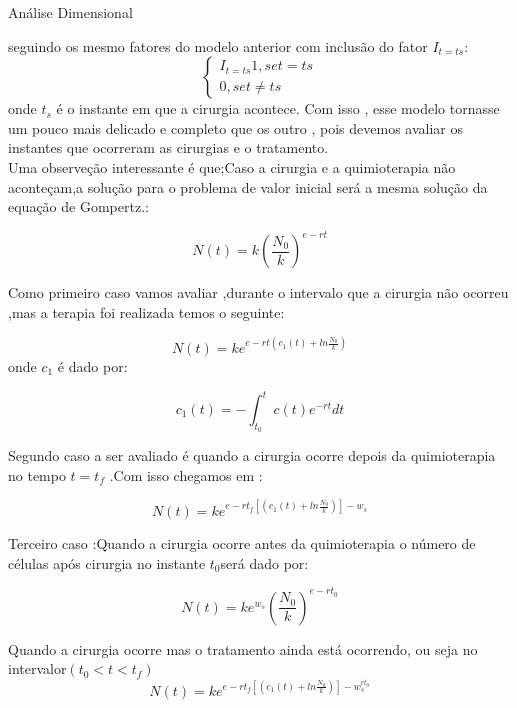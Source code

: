 Análise Dimensional

seguindo os mesmo fatores do modelo anterior com  inclusão do fator $I_{t=ts}$:
 \begin{equation*}
\begin{cases} I_{t=ts}
  1 , se t=ts\\
  0 , se  t\neq ts 
\end{cases}
\end{equation*}
onde $t_s$ é o instante em que a cirurgia acontece.
Com isso , esse modelo tornasse um pouco mais delicado e completo que os outro , pois devemos avaliar os instantes que ocorreram as cirurgias e o tratamento.
\\
Uma observeção interessante é que;Caso a cirurgia e a quimioterapia não aconteçam,a solução para o problema de valor inicial será a mesma solução da equação de Gompertz.:

\begin{equation*}
N(t)=k(\frac{N_0}{k})^{e-rt} 
\end{equation*}

Como primeiro caso vamos avaliar ,durante o intervalo que a cirurgia não ocorreu ,mas a terapia foi realizada temos o seguinte:

\begin{equation*}
N(t)=ke^{e-rt(c_1(t)+ln\frac{N_0}{k})}
\end{equation*}
onde $c_1$ é dado por:

\begin{equation*}
 c_1(t)=-\int_{t_0}^{t}c(t)e^{-rt}dt
\end{equation*}

Segundo caso a ser avaliado é quando a  cirurgia  ocorre depois da quimioterapia no tempo $t=t_f$ .Com isso chegamos em :

\begin{equation*}
   N(t)=ke^{e-rt_f[(c_1(t)+ln\frac{N_0}{k})]-w_s}
\end{equation*}

Terceiro caso :Quando a cirurgia ocorre antes da quimioterapia
 o número de células após cirurgia no instante $t_0$será dado por:

 \begin{equation*}
   N(t)=ke^{w_s}(\frac{N_0}{k})^{e-rt_0}
\end{equation*}

 Quando a cirurgia ocorre mas o tratamento ainda está ocorrendo, ou seja no intervalor$(t_0<t<t_f)$
\begin{equation*}
    N(t)=ke^{e-rt_f[(c_1(t)+ln\frac{N_0}{k})]-w_s^{rt_0}}   
\end{equation*}
